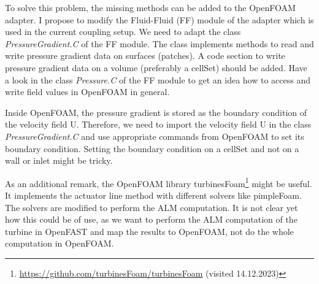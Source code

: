 To solve this problem, the missing methods can be added to the OpenFOAM adapter. I propose to modify the Fluid-Fluid (FF) module of the adapter which is used in the current coupling setup. We need to adapt the class \textit{PressureGradient.C} of the FF module. The class implements methods to read and write pressure gradient data on surfaces (patches). A code section to write pressure gradient data on a volume (preferably a cellSet) should be added. Have a look in the class \textit{Pressure.C} of the FF module to get an idea how to access and write field values in OpenFOAM in general.

Inside OpenFOAM, the pressure gradient is stored as the boundary condition of the velocity field U. Therefore, we need to import the velocity field U in the class \textit{PressureGradient.C} and use appropriate commands from OpenFOAM to set its boundary condition. Setting the boundary condition on a cellSet and not on a wall or inlet might be tricky.

As an additional remark, the OpenFOAM library turbinesFoam\footnote{\url{https://github.com/turbinesFoam/turbinesFoam} (visited 14.12.2023)} \cite{Bachant:2018} might be useful. It implements the actuator line method with different solvers like pimpleFoam. The solvers are modified to perform the ALM computation. It is not clear yet how this could be of use, as we want to perform the ALM computation of the turbine in OpenFAST and map the results to OpenFOAM, not do the whole computation in OpenFOAM.

